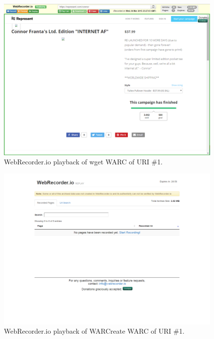 \documentclass[a4paper,12pt]{article}
\begin{document}
\begin{appendices}
\begin{figure}[H]
    \centering
    \includegraphics[scale=0.5]{images/1_wget_in_webrecorder.png}
    \caption{WebRecorder.io playback of wget WARC of URI \#1.}
\end{figure}
\begin{figure}[H]
    \centering
    \includegraphics[scale=0.5]{images/1_warcreate_in_webrecorder.png}
    \caption{WebRecorder.io playback of WARCreate WARC of URI \#1.}
\end{figure}
\begin{figure}[H]
    \centering

\end{figure}
\end{appendices}
\end{document}
